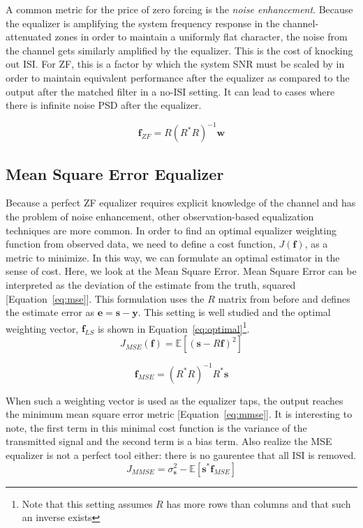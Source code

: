 \documentclass[]{article}
\begin{document}
A common metric for the price of zero forcing is the \emph{noise enhancement}.  Because the equalizer is amplifying the system frequency response in the channel-attenuated zones in order to maintain a uniformly flat character, the noise from the channel gets similarly amplified by the equalizer.  This is the cost of knocking out ISI.  For ZF, this is a factor by which the system SNR must be scaled by in order to maintain equivalent performance after the equalizer as compared to the output after the matched filter in a no-ISI setting.  It can lead to cases where there is infinite noise PSD after the equalizer.

\begin{equation}
\label{eq:zf} 
\mathbf{f}_{ZF} = R \left(R^{\ast}R \right)^{-1} \mathbf{w}
\end{equation}

\subsection{Mean Square Error Equalizer}
\label{sec:optimal}
Because a perfect ZF equalizer requires explicit knowledge of the channel and has the problem of noise enhancement, other observation-based equalization techniques are more common.  In order to find an optimal equalizer weighting function from observed data, we need to define a cost function, $J(\mathbf{f})$, as a metric to minimize.  In this way, we can formulate an optimal estimator in the sense of cost.  Here, we look at the Mean Square Error.  Mean Square Error can be interpreted as the deviation of the estimate from the truth, squared [Equation~\ref{eq:mse}].  This formulation uses the $R$ matrix from before and defines the estimate error as $\mathbf{e} = \mathbf{s} - \mathbf{y}$.  This setting is well studied and the optimal weighting vector, $\mathbf{f}_{LS}$ is shown in Equation~\ref{eq:optimal}\footnote{Note that this setting assumes $R$ has more rows than columns and that such an inverse exists}.
\begin{equation}
\label{eq:mse} 
J_{MSE} \left( \mathbf{f}\right) = \mathbb{E} \left[ \left(\mathbf{s} - R \mathbf{f} \right)^2 \right]
\end{equation}

\begin{equation}
\label{eq:optimal}
\mathbf{f}_{MSE} = \left(R^{\ast}R\right)^{-1}R^{\ast}\mathbf{s}
\end{equation}

When such a weighting vector is used as the equalizer taps, the output reaches the minimum mean square error metric  [Equation~\ref{eq:mmse}].  It is interesting to note, the first term in this minimal cost function is the variance of the transmitted signal and the second term is a bias term.  Also realize the MSE equalizer is not a perfect tool either: there is no gaurentee that all ISI is removed.
\begin{equation}
\label{eq:mmse}
J_{MMSE} =  \sigma_{\mathbf{s}}^{2} - \mathbb{E} \left[ \mathbf{s}^{\ast} \mathbf{f}_{MSE} \right]
\end{equation}
\end{document}
